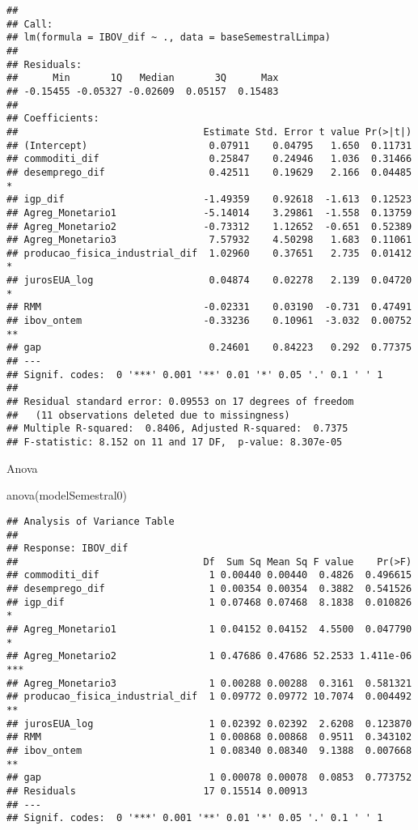 \documentclass[
]{article}
\newenvironment{Shaded}{\begin{snugshade}}{\end{snugshade}}
\newcommand{\FunctionTok}[1]{\textcolor[rgb]{0.00,0.00,0.00}{#1}}
\newcommand{\NormalTok}[1]{#1}
\begin{document}
\begin{verbatim}
## 
## Call:
## lm(formula = IBOV_dif ~ ., data = baseSemestralLimpa)
## 
## Residuals:
##      Min       1Q   Median       3Q      Max 
## -0.15455 -0.05327 -0.02609  0.05157  0.15483 
## 
## Coefficients:
##                                Estimate Std. Error t value Pr(>|t|)   
## (Intercept)                     0.07911    0.04795   1.650  0.11731   
## commoditi_dif                   0.25847    0.24946   1.036  0.31466   
## desemprego_dif                  0.42511    0.19629   2.166  0.04485 * 
## igp_dif                        -1.49359    0.92618  -1.613  0.12523   
## Agreg_Monetario1               -5.14014    3.29861  -1.558  0.13759   
## Agreg_Monetario2               -0.73312    1.12652  -0.651  0.52389   
## Agreg_Monetario3                7.57932    4.50298   1.683  0.11061   
## producao_fisica_industrial_dif  1.02960    0.37651   2.735  0.01412 * 
## jurosEUA_log                    0.04874    0.02278   2.139  0.04720 * 
## RMM                            -0.02331    0.03190  -0.731  0.47491   
## ibov_ontem                     -0.33236    0.10961  -3.032  0.00752 **
## gap                             0.24601    0.84223   0.292  0.77375   
## ---
## Signif. codes:  0 '***' 0.001 '**' 0.01 '*' 0.05 '.' 0.1 ' ' 1
## 
## Residual standard error: 0.09553 on 17 degrees of freedom
##   (11 observations deleted due to missingness)
## Multiple R-squared:  0.8406, Adjusted R-squared:  0.7375 
## F-statistic: 8.152 on 11 and 17 DF,  p-value: 8.307e-05
\end{verbatim}

Anova

\begin{Shaded}
\begin{Highlighting}[]
\FunctionTok{anova}\NormalTok{(modelSemestral0)}
\end{Highlighting}
\end{Shaded}

\begin{verbatim}
## Analysis of Variance Table
## 
## Response: IBOV_dif
##                                Df  Sum Sq Mean Sq F value    Pr(>F)    
## commoditi_dif                   1 0.00440 0.00440  0.4826  0.496615    
## desemprego_dif                  1 0.00354 0.00354  0.3882  0.541526    
## igp_dif                         1 0.07468 0.07468  8.1838  0.010826 *  
## Agreg_Monetario1                1 0.04152 0.04152  4.5500  0.047790 *  
## Agreg_Monetario2                1 0.47686 0.47686 52.2533 1.411e-06 ***
## Agreg_Monetario3                1 0.00288 0.00288  0.3161  0.581321    
## producao_fisica_industrial_dif  1 0.09772 0.09772 10.7074  0.004492 ** 
## jurosEUA_log                    1 0.02392 0.02392  2.6208  0.123870    
## RMM                             1 0.00868 0.00868  0.9511  0.343102    
## ibov_ontem                      1 0.08340 0.08340  9.1388  0.007668 ** 
## gap                             1 0.00078 0.00078  0.0853  0.773752    
## Residuals                      17 0.15514 0.00913                      
## ---
## Signif. codes:  0 '***' 0.001 '**' 0.01 '*' 0.05 '.' 0.1 ' ' 1
\end{verbatim}
\end{document}
